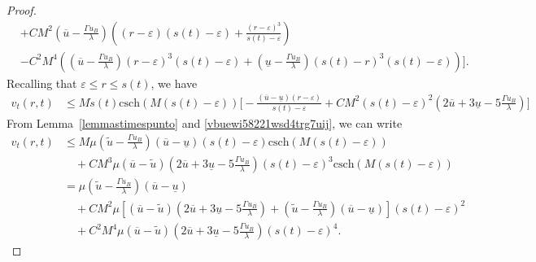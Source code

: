 \documentclass[12pt,a4paper,intlimits,sumlimits]{amsart}
\theoremstyle{definition}
\theoremstyle{plain}
\numberwithin{equation}{section}
\renewcommand{\leq}{\leqslant}
\begin{document}
\begin{proof}
\[\begin{split}
&+CM^2 \left(\overline{u}  -\frac{\Gamma u_B}{\lambda}\right)\left((r-\varepsilon)(s(t)-\varepsilon)+\frac{(r-\varepsilon)^3}{s(t)-\varepsilon}\right) \\
&-C^2M^4\left(\left(\overline{u}  -\frac{\Gamma u_B}{\lambda}\right) (r-\varepsilon)^3(s(t)-\varepsilon)+ \left(\underline{u}  -\frac{\Gamma u_B}{\lambda}\right)(s(t)-r)^3(s(t)-\varepsilon)\right)
\Bigg].
\end{split}
\]
Recalling that $\varepsilon\leq r \leq s(t)$, we have
\[
\begin{aligned}
v_t(r,t)&\leq M\dot s(t)\mbox{csch}(M(s(t)-\varepsilon))\Bigg[-\frac{(\overline u -\underline u)(r-\varepsilon)}{s(t)-\varepsilon} +CM^2(s(t)-\varepsilon)^2 \left(2\overline u+3\underline u-5\frac{\Gamma u_B}{\lambda} \right)
\Bigg]
\end{aligned}
\]
From Lemma~\ref{lemmastimespunto} and \eqref{vbuewi58221wsd4trg7uij},
 we can write
\begin{equation}\label{mnbvc09876iuytrewjhgf}
\begin{split}
v_t(r, t)&\leq M\mu \left(\widetilde u -\frac{\Gamma u_B}{\lambda} \right)(\overline u-\underline u)(s(t)-\varepsilon)\mbox{csch}(M(s(t)-\varepsilon)) \\
&\quad +CM^3\mu (\overline u -\widetilde u)\left(2\overline u+3\underline u-5\frac{\Gamma u_B}{\lambda} \right)(s(t)-\varepsilon)^3\mbox{csch}(M(s(t)-\varepsilon)) \\
&=\mu\left(\widetilde u -\frac{\Gamma u_B}{\lambda} \right)(\overline u-\underline u)\\
&\quad+CM^2\mu\left[(\overline u-\widetilde u)\left(2\overline u+3\underline u-5\frac{\Gamma u_B}{\lambda} \right)+ \left(\widetilde u -\frac{\Gamma u_B}{\lambda} \right)(\overline u-\underline u)\right](s(t)-\varepsilon)^2 \\
&\quad +C^2M^4\mu(\overline u-\widetilde u)\left(2\overline u+3\underline u-5\frac{\Gamma u_B}{\lambda} \right)(s(t)-\varepsilon)^4.
\end{split}
\end{equation}


\end{proof}
\end{document}
